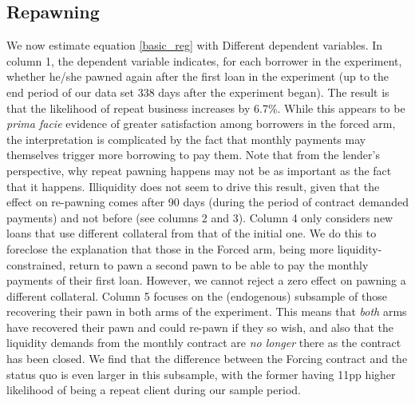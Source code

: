 \begin{appendix}
\newpage 

\normalsize

\normalsize


\subsection{Repawning}

We now estimate equation \ref{basic_reg} with Different dependent variables.  In column 1, the dependent variable indicates, for each borrower in the experiment, whether he/she pawned again after the first loan in the
experiment (up to the end period of our data set 338 days after the experiment began). The result is that the likelihood of repeat business increases by 6.7\%.  While this appears to be \emph{prima facie} evidence of greater satisfaction among borrowers in the forced arm, the interpretation is complicated by the fact that monthly payments may themselves trigger more borrowing to pay them. Note that from the lender's perspective, why repeat pawning happens may not be as important as the fact that it happens. Illiquidity does not seem to drive this result, given that the effect on re-pawning comes after 90 days (during the period of contract demanded payments) and not before  (see columns 2 and 3). Column 4 only considers new loans that use different collateral from that of the initial one. We do this to foreclose the explanation that those in the Forced arm, being more liquidity-constrained, return to pawn a second pawn to be able to pay the monthly payments of their first loan. However, we cannot reject a zero effect on pawning a different collateral. Column 5 focuses on the (endogenous) subsample of those recovering their pawn in both arms of the experiment. This means that \textit{both} arms have recovered their pawn and could re-pawn if they so wish, and also that the liquidity demands from the monthly contract are \textit{no longer} there as the contract has been closed.  We find that the difference between the Forcing contract and the status quo is even larger in this subsample, with the former having 11pp higher likelihood of being a repeat client during our sample period.


\end{appendix}
